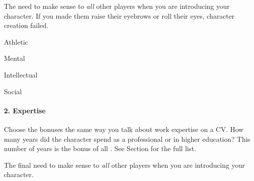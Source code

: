 \begin{emphasisParagraph}
The  need to make sense to \emph{all} other players
when you are introducing your character.
If you made them raise their eyebrows or roll their eyes, character creation failed.
\end{emphasisParagraph}


\begin{capabilitiesTable}{Athletic}
\end{capabilitiesTable}
\begin{capabilitiesTable}{Mental}
\end{capabilitiesTable}
\begin{capabilitiesTable}{Intellectual}
\end{capabilitiesTable}
\begin{capabilitiesTable}{Social}
\end{capabilitiesTable}

\paragraph*{2. Expertise}

\begin{marginNote}
	
\end{marginNote}
Choose the bonuses the same way you talk about work expertise on a CV.
How many years did the character spend as a professional or in higher education?
This number of years is the bonus of all .
See Section  for the full list.

The final  need to make sense to \emph{all} other players
when you are introducing your character.\par



